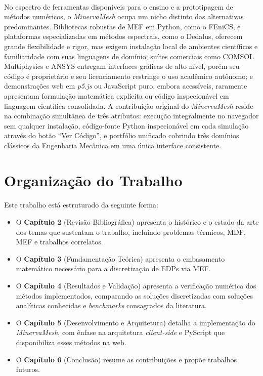 \paragraph{}No espectro de ferramentas disponíveis para o ensino e a prototipagem de métodos numéricos, o \textit{MinervaMesh} ocupa um nicho distinto das alternativas predominantes. Bibliotecas robustas de MEF em Python, como o FEniCS, e plataformas especializadas em métodos espectrais, como o Dedalus, oferecem grande flexibilidade e rigor, mas exigem instalação local de ambientes científicos e familiaridade com suas linguagens de domínio; suítes comerciais como COMSOL Multiphysics e ANSYS entregam interfaces gráficas de alto nível, porém seu código é proprietário e seu licenciamento restringe o uso acadêmico autônomo; e demonstrações web em \textit{p5.js} ou JavaScript puro, embora acessíveis, raramente apresentam formulação matemática explícita ou código inspecionável em linguagem científica consolidada. A contribuição original do \textit{MinervaMesh} reside na combinação simultânea de três atributos: execução integralmente no navegador sem qualquer instalação, código-fonte Python inspecionável em cada simulação através do botão ``Ver Código'', e portfólio unificado cobrindo três domínios clássicos da Engenharia Mecânica em uma única interface consistente.

\section{Organização do Trabalho}

\paragraph{}Este trabalho está estruturado da seguinte forma:
\begin{itemize}
    \item O \textbf{Capítulo 2} (Revisão Bibliográfica) apresenta o histórico e o estado da arte dos temas que sustentam o trabalho, incluindo problemas térmicos, MDF, MEF e trabalhos correlatos.
    \item O \textbf{Capítulo 3} (Fundamentação Teórica) apresenta o embasamento matemático necessário para a discretização de EDPs via MEF.
    \item O \textbf{Capítulo 4} (Resultados e Validação) apresenta a verificação numérica dos métodos implementados, comparando as soluções discretizadas com soluções analíticas conhecidas e \textit{benchmarks} consagrados da literatura.
    \item O \textbf{Capítulo 5} (Desenvolvimento e Arquitetura) detalha a implementação do \textit{MinervaMesh}, com ênfase na arquitetura \textit{client-side} e PyScript que disponibiliza esses métodos na web.
    \item O \textbf{Capítulo 6} (Conclusão) resume as contribuições e propõe trabalhos futuros.
\end{itemize}
